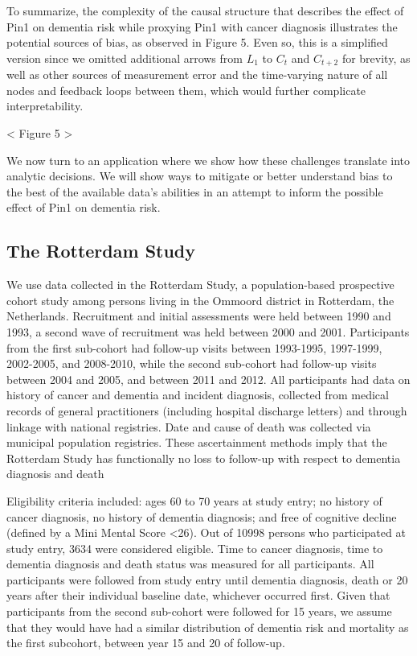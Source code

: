 \documentclass[
]{book}
\begin{document}
To summarize, the complexity of the causal structure that describes the effect of Pin1 on dementia risk while proxying Pin1 with cancer diagnosis illustrates the potential sources of bias, as observed in Figure 5. Even so, this is a simplified version since we omitted additional arrows from \(L_1\) to \(C_t\) and \(C_{t+2}\) for brevity, as well as other sources of measurement error and the time-varying nature of all nodes and feedback loops between them, which would further complicate interpretability\autocite{whatif2020}.

\textless{} Figure 5 \textgreater{}

We now turn to an application where we show how these challenges translate into analytic decisions. We will show ways to mitigate or better understand bias to the best of the available data's abilities in an attempt to inform the possible effect of Pin1 on dementia risk.

\hypertarget{the-rotterdam-study}{%
\subsection{The Rotterdam Study}\label{the-rotterdam-study}}

We use data collected in the Rotterdam Study, a population-based prospective cohort study among persons living in the Ommoord district in Rotterdam, the Netherlands. Recruitment and initial assessments were held between 1990 and 1993, a second wave of recruitment was held between 2000 and 2001. Participants from the first sub-cohort had follow-up visits between 1993-1995, 1997-1999, 2002-2005, and 2008-2010, while the second sub-cohort had follow-up visits between 2004 and 2005, and between 2011 and 2012\autocite{ikram2020}. All participants had data on history of cancer and dementia and incident diagnosis, collected from medical records of general practitioners (including hospital discharge letters) and through linkage with national registries. Date and cause of death was collected via municipal population registries. These ascertainment methods imply that the Rotterdam Study has functionally no loss to follow-up with respect to dementia diagnosis and death

Eligibility criteria included: ages 60 to 70 years at study entry; no history of cancer diagnosis, no history of dementia diagnosis; and free of cognitive decline (defined by a Mini Mental Score \textless26). Out of 10998 persons who participated at study entry, 3634 were considered eligible. Time to cancer diagnosis, time to dementia diagnosis and death status was measured for all participants. All participants were followed from study entry until dementia diagnosis, death or 20 years after their individual baseline date, whichever occurred first. Given that participants from the second sub-cohort were followed for 15 years, we assume that they would have had a similar distribution of dementia risk and mortality as the first subcohort, between year 15 and 20 of follow-up.
\end{document}
